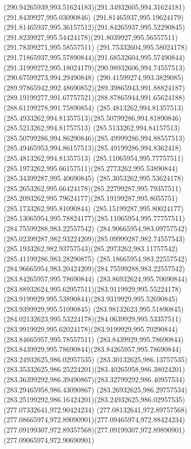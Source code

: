{{		\curveto(290.94265939,993.51624183)(291.34932605,994.31624181)(291.8439927,995.03090846)
		\curveto(291.81465937,995.19624179)(291.81465937,995.36157512)(291.84265937,995.52290845)
		\curveto(291.8239927,995.54424178)(291.8039927,995.56557511)(291.78399271,995.58557511)
		\curveto(291.75332604,995.58024178)(291.71865937,995.57890844)(291.68532604,995.57490844)
		\curveto(291.31999272,995.18024179)(290.98932606,994.74557513)(290.67599273,994.29490848)
		\curveto(290.41599274,993.3829085)(289.97865942,992.48690852)(289.39865943,991.88824187)
		\curveto(289.19199277,991.67757521)(288.87865944,991.65624188)(288.61199278,991.75890854)
		\moveto(285.4813262,994.81357513)
		\curveto(285.4933262,994.81357513)(285.50799286,994.81890846)(285.5213262,994.81757513)
		\curveto(285.5133262,994.84157513)(285.50799286,994.86290846)(285.49999286,994.88557513)
		\curveto(285.49465953,994.86157513)(285.49199286,994.8362418)(285.4813262,994.81357513)
		\moveto(285.11065954,995.77757511)
		\curveto(285.1973262,995.66157511)(285.2773262,995.53890844)(285.34399287,995.40690845)
		\curveto(285.3053262,995.53624178)(285.2653262,995.66424178)(285.22799287,995.79357511)
		\curveto(285.2093262,995.79624177)(285.19199287,995.8055751)(285.1733262,995.81090844)
		\curveto(285.15199287,995.80024177)(285.13065954,995.78824177)(285.11065954,995.77757511)
		\moveto(284.75599288,983.22557542)
		\curveto(284.90665954,983.09757542)(285.02399287,982.93224209)(285.09999287,982.74557543)
		\curveto(285.1933262,982.93757543)(285.2973262,983.11757542)(285.41199286,983.28290875)
		\curveto(285.18665954,983.22557542)(284.96665954,983.20424209)(284.75599288,983.22557542)
		\moveto(283.84265957,995.78690844)
		\curveto(283.86932624,995.70690844)(283.88932624,995.62957511)(283.9119929,995.55224178)
		\curveto(283.9199929,995.53890844)(283.9319929,995.52690845)(283.9399929,995.51090845)
		\curveto(283.98132623,995.51890845)(284.02132623,995.53224178)(284.0639929,995.53357511)
		\curveto(283.9919929,995.62024178)(283.9199929,995.70290844)(283.84665957,995.78557511)
		\curveto(283.8439929,995.78690844)(283.8439929,995.78690844)(283.84265957,995.78690844)
		\moveto(283.24932625,986.02957535)
		\curveto(283.30132625,986.13757535)(283.35332625,986.25224201)(283.40265958,986.38024201)
		\curveto(283.36399292,986.39490867)(283.32799292,986.40957534)(283.29465958,986.43090867)
		\curveto(283.26932625,986.29757534)(283.25199292,986.16424201)(283.24932625,986.02957535)
		\moveto(277.07332641,972.90424234)
		\curveto(277.08132641,972.89757568)(277.08665974,972.89090901)(277.09465974,972.88424234)
		\curveto(277.09199307,972.89357568)(277.09199307,972.89890901)(277.09065974,972.90690901)
}}

